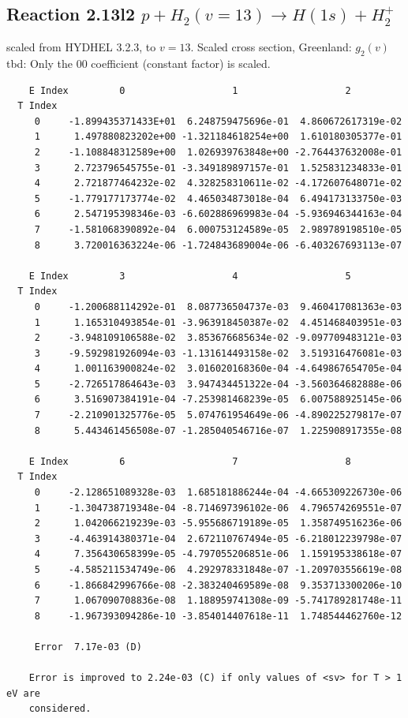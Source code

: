 \documentclass[12pt,dvipdfmx]{article}
\begin{document}
\subsection{
Reaction 2.13l2 $   p + H_2(v=13) \rightarrow H(1s) + H_2^+$}
scaled from HYDHEL 3.2.3, to $v=13$. Scaled cross section, Greenland: $g_2(v)$
tbd:
Only the 00 coefficient (constant factor) is scaled.


\begin{small}\begin{verbatim}
    E Index         0                   1                   2
  T Index
     0     -1.899435371433E+01  6.248759475696e-01  4.860672617319e-02
     1      1.497880823202e+00 -1.321184618254e+00  1.610180305377e-01
     2     -1.108848312589e+00  1.026939763848e+00 -2.764437632008e-01
     3      2.723796545755e-01 -3.349189897157e-01  1.525831234833e-01
     4      2.721877464232e-02  4.328258310611e-02 -4.172607648071e-02
     5     -1.779177173774e-02  4.465034873018e-04  6.494173133750e-03
     6      2.547195398346e-03 -6.602886969983e-04 -5.936946344163e-04
     7     -1.581068390892e-04  6.000753124589e-05  2.989789198510e-05
     8      3.720016363224e-06 -1.724843689004e-06 -6.403267693113e-07

    E Index         3                   4                   5
  T Index
     0     -1.200688114292e-01  8.087736504737e-03  9.460417081363e-03
     1      1.165310493854e-01 -3.963918450387e-02  4.451468403951e-03
     2     -3.948109106588e-02  3.853676685634e-02 -9.097709483121e-03
     3     -9.592981926094e-03 -1.131614493158e-02  3.519316476081e-03
     4      1.001163900824e-02  3.016020168360e-04 -4.649867654705e-04
     5     -2.726517864643e-03  3.947434451322e-04 -3.560364682888e-06
     6      3.516907384191e-04 -7.253981468239e-05  6.007588925145e-06
     7     -2.210901325776e-05  5.074761954649e-06 -4.890225279817e-07
     8      5.443461456508e-07 -1.285040546716e-07  1.225908917355e-08

    E Index         6                   7                   8
  T Index
     0     -2.128651089328e-03  1.685181886244e-04 -4.665309226730e-06
     1     -1.304738719348e-04 -8.714697396102e-06  4.796574269551e-07
     2      1.042066219239e-03 -5.955686719189e-05  1.358749516236e-06
     3     -4.463914380371e-04  2.672110767494e-05 -6.218012239798e-07
     4      7.356430658399e-05 -4.797055206851e-06  1.159195338618e-07
     5     -4.585211534749e-06  4.292978331848e-07 -1.209703556619e-08
     6     -1.866842996766e-08 -2.383240469589e-08  9.353713300206e-10
     7      1.067090708836e-08  1.188959741308e-09 -5.741789281748e-11
     8     -1.967393094286e-10 -3.854014407618e-11  1.748544462760e-12

     Error  7.17e-03 (D)

    Error is improved to 2.24e-03 (C) if only values of <sv> for T > 1 eV are
    considered.
\end{verbatim}\end{small}
\newpage
\end{document}
